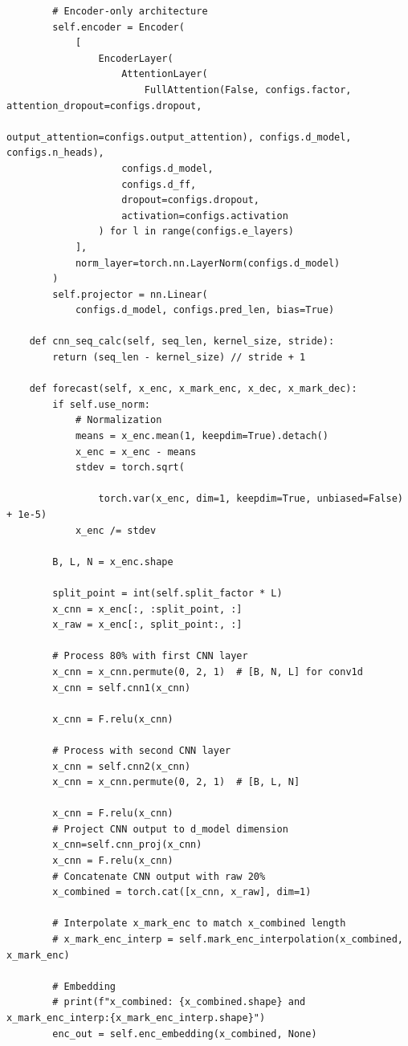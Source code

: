 \documentclass[stu,12pt,floatsintext]{apa7}
\begin{document}
\begin{verbatim}
        # Encoder-only architecture
        self.encoder = Encoder(
            [
                EncoderLayer(
                    AttentionLayer(
                        FullAttention(False, configs.factor, attention_dropout=configs.dropout,
                                      output_attention=configs.output_attention), configs.d_model, configs.n_heads),
                    configs.d_model,
                    configs.d_ff,
                    dropout=configs.dropout,
                    activation=configs.activation
                ) for l in range(configs.e_layers)
            ],
            norm_layer=torch.nn.LayerNorm(configs.d_model)
        )
        self.projector = nn.Linear(
            configs.d_model, configs.pred_len, bias=True)

    def cnn_seq_calc(self, seq_len, kernel_size, stride):
        return (seq_len - kernel_size) // stride + 1

    def forecast(self, x_enc, x_mark_enc, x_dec, x_mark_dec):
        if self.use_norm:
            # Normalization
            means = x_enc.mean(1, keepdim=True).detach()
            x_enc = x_enc - means
            stdev = torch.sqrt(
                
                torch.var(x_enc, dim=1, keepdim=True, unbiased=False) + 1e-5)
            x_enc /= stdev

        B, L, N = x_enc.shape

        split_point = int(self.split_factor * L)
        x_cnn = x_enc[:, :split_point, :]
        x_raw = x_enc[:, split_point:, :]

        # Process 80% with first CNN layer
        x_cnn = x_cnn.permute(0, 2, 1)  # [B, N, L] for conv1d
        x_cnn = self.cnn1(x_cnn)

        x_cnn = F.relu(x_cnn)

        # Process with second CNN layer
        x_cnn = self.cnn2(x_cnn)
        x_cnn = x_cnn.permute(0, 2, 1)  # [B, L, N]

        x_cnn = F.relu(x_cnn)
        # Project CNN output to d_model dimension
        x_cnn=self.cnn_proj(x_cnn)
        x_cnn = F.relu(x_cnn)
        # Concatenate CNN output with raw 20%
        x_combined = torch.cat([x_cnn, x_raw], dim=1)

        # Interpolate x_mark_enc to match x_combined length
        # x_mark_enc_interp = self.mark_enc_interpolation(x_combined, x_mark_enc)

        # Embedding
        # print(f"x_combined: {x_combined.shape} and x_mark_enc_interp:{x_mark_enc_interp.shape}")
        enc_out = self.enc_embedding(x_combined, None)


\end{verbatim}
\end{document}
